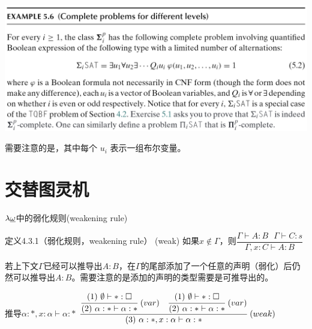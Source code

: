 \documentclass[UTF8,aspectratio=169,mathserif]{beamer}
\begin{document}
	\begin{frame}
		\includegraphics[width=\linewidth]{../5 & 6/note.assets/image-20210427093527360.png}\newline
		
		需要注意的是，其中每个 $u_i$ 表示一组布尔变量。
	\end{frame}
	
	\section{交替图灵机}
	\begin{frame}{$\lambda{\uline{\omega}}$中的弱化规则(weakening rule)}
		\begin{exampleblock}{定义4.3.1（弱化规则，weakening rule）}
			(weak) 如果$x\not\in\Gamma$，则$\dfrac{\Gamma\vdash A:B\ \ \ \Gamma\vdash C:s}{\Gamma,x:C\vdash A:B}$
		\end{exampleblock}
		
		若上下文$\Gamma$已经可以推导出$A:B$，在$\Gamma$的尾部添加了一个任意的声明（弱化）后仍然可以推导出$A:B$。需要注意的是添加的声明的类型需要是可推导出的。
		
		\begin{block}{推导$\alpha:*,x:\alpha\vdash\alpha:*$}
			$\cfrac{\cfrac{(1)\ \emptyset\vdash*:\square}{(2)\ \alpha:*\vdash\alpha:*}\ (var)\ \ \ \cfrac{(1)\ \emptyset\vdash*:\square}{(2)\ \alpha:*\vdash\alpha:*}\ (var)}{(3)\ \alpha:*,x:\alpha\vdash\alpha:*}\ (weak)$
		\end{block}
		
	\end{frame}
	
\end{document}
